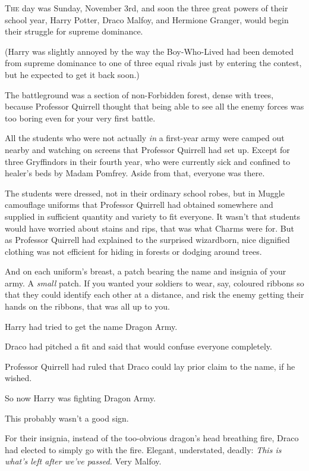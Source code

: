 
\lettrine{T}{he} day was Sunday, November 3rd, and soon the three great powers of their school year, Harry Potter, Draco Malfoy, and Hermione Granger, would begin their struggle for supreme dominance.

(Harry was slightly annoyed by the way the Boy-Who-Lived had been demoted from supreme dominance to one of three equal rivals just by entering the contest, but he expected to get it back soon.)

The battleground was a section of non-Forbidden forest, dense with trees, because Professor Quirrell thought that being able to see all the enemy forces was too boring even for your very first battle.

All the students who were not actually \emph{in} a first-year army were camped out nearby and watching on screens that Professor Quirrell had set up. Except for three Gryffindors in their fourth year, who were currently sick and confined to healer’s beds by Madam Pomfrey. Aside from that, everyone was there.

The students were dressed, not in their ordinary school robes, but in Muggle camouflage uniforms that Professor Quirrell had obtained somewhere and supplied in sufficient quantity and variety to fit everyone. It wasn’t that students would have worried about stains and rips, that was what Charms were for. But as Professor Quirrell had explained to the surprised wizardborn, nice dignified clothing was not efficient for hiding in forests or dodging around trees.

And on each uniform’s breast, a patch bearing the name and insignia of your army. A \emph{small} patch. If you wanted your soldiers to wear, say, coloured ribbons so that they could identify each other at a distance, and risk the enemy getting their hands on the ribbons, that was all up to you.

Harry had tried to get the name Dragon Army.

Draco had pitched a fit and said that would confuse everyone completely.

Professor Quirrell had ruled that Draco could lay prior claim to the name, if he wished.

So now Harry was fighting Dragon Army.

This probably wasn’t a good sign.

For their insignia, instead of the too-obvious dragon’s head breathing fire, Draco had elected to simply go with the fire. Elegant, understated, deadly: \emph{This is what’s left after we’ve passed.} Very Malfoy.

